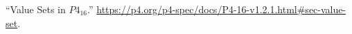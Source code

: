\documentclass[11pt]{article}
\begin{document}
{{\begin{thebibliography}{45}
\mdbibitemlabel{{}[45]}\textquotedblleft{}Value Sets in $P4_{16}$.\textquotedblright{} \href{https://p4.org/p4-spec/docs/P4-16-v1.2.1.html\%23sec-value-set}{{\ttfamily https://\hspace{0pt}p4.\hspace{0pt}org/\hspace{0pt}p4-\hspace{0pt}spec/\hspace{0pt}docs/\hspace{0pt}P4-\hspace{0pt}16-\hspace{0pt}v1.\hspace{0pt}2.\hspace{0pt}1.\hspace{0pt}html\#\hspace{0pt}sec-\hspace{0pt}value-\hspace{0pt}set}}.\label{p4valuesets}%
\par%
\end{thebibliography}}%
}%
\end{document}
